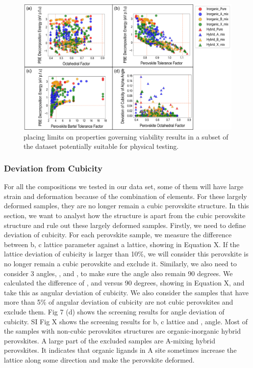 \documentclass[twoside, twocolumn, 9pt, draft]{article}
\begin{document}
\begin{figure}
\centering
\includegraphics[width=.9\linewidth]{Figure6.png}
\caption{\label{fig:cuts} placing limits on properties governing viability results in a subset of the dataset potentially suitable for physical testing.}
\end{figure}

\subsubsection*{Deviation from Cubicity}
\label{sec:org21d07ec}
For all the compositions we tested in our data set, some of them will
have large strain and deformation because of the combination of
elements. For these largely deformed samples, they are no longer remain
a cubic perovskite structure. In this section, we want to analyst how
the structure is apart from the cubic perovskite structure and rule out
these largely deformed samples. Firstly, we need to define deviation of
cubicity. For each perovskite sample, we measure the difference between
b, c lattice parameter against a lattice, showing in Equation X. If the
lattice deviation of cubicity is larger than 10\%, we will consider this
perovskite is no longer remain a cubic perovskite and exclude it.
Similarly, we also need to consider 3 angles, , and , to make sure the
angle also remain 90 degrees. We calculated the difference of , and
versus 90 degrees, showing in Equation X, and take this as angular
deviation of cubicity. We also consider the samples that have more than
5\% of angular deviation of cubicity are not cubic perovskites and
exclude them. Fig 7 (d) shows the screening results for angle deviation
of cubicity. SI Fig X shows the screening results for b, c lattice and ,
angle. Most of the samples with non-cubic perovskites structures are
organic-inorganic hybrid perovskites. A large part of the excluded
samples are A-mixing hybrid perovskites. It indicates that organic
ligands in A site sometimes increase the lattice along some direction
and make the perovskite deformed.
\end{document}
